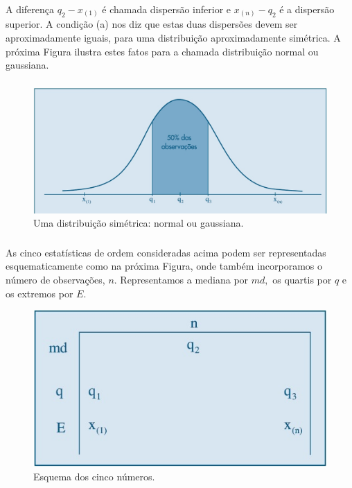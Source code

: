 \documentclass[14pt,aspectratio=1610]{beamer}
\begin{document}
\begin{frame}{}
\frametitle{}
\begin{block}{}
\justifying
A diferença $q_{2}- x_{(1)}$ é chamada dispersão inferior e $x_{(n)}-q_{2}$ é a dispersão superior.
A condição (a) nos diz que estas duas dispersões devem ser aproximadamente iguais, para uma distribuição 
aproximadamente simétrica. A próxima Figura ilustra estes fatos para a chamada distribuição normal ou gaussiana.
\end{block}
\end{frame}

\begin{frame}{}
\frametitle{}
\begin{block}{}
\justifying
\begin{figure}[H]
    \centering
    \includegraphics[scale=0.5]{Fig7}
    \caption{Uma distribuição simétrica: normal ou gaussiana.}
    \label{Fig7_ex}
  \end{figure}
\end{block}
\end{frame}

\begin{frame}{}
\frametitle{}
\begin{block}{}
\justifying
As cinco estatísticas de ordem consideradas acima podem ser representadas esquematicamente como na próxima Figura, onde também incorporamos o número de observações, $n.$ Representamos a mediana por $md,$ os quartis por $q$ e os extremos por $E.$
\begin{figure}[H]
    \centering
    \includegraphics[scale=0.5]{Fig8}
    \caption{Esquema dos cinco números.}
    \label{Fig8_ex}
  \end{figure}
\end{block}
\end{frame}
\end{document}

